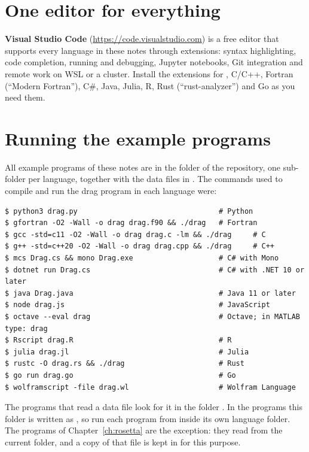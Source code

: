 \section*{One editor for everything}

\textbf{Visual Studio Code} (\url{https://code.visualstudio.com}) is a free editor that
supports every language in these notes through extensions: syntax highlighting, code
completion, running and debugging, Jupyter notebooks, Git integration and remote work on
WSL or a cluster. Install the extensions for \py, C/C++, Fortran (``Modern Fortran''), C\#,
Java, Julia, R, Rust (``rust-analyzer'') and Go as you need them.

\section*{Running the example programs}

All example programs of these notes are in the folder  of the repository,
one sub-folder per language, together with the data files in . The
commands used to compile and run the drag program in each language were:
\begin{lstlisting}[style=shell]
$ python3 drag.py                                 # Python
$ gfortran -O2 -Wall -o drag drag.f90 && ./drag   # Fortran
$ gcc -std=c11 -O2 -Wall -o drag drag.c -lm && ./drag     # C
$ g++ -std=c++20 -O2 -Wall -o drag drag.cpp && ./drag     # C++
$ mcs Drag.cs && mono Drag.exe                    # C# with Mono
$ dotnet run Drag.cs                              # C# with .NET 10 or later
$ java Drag.java                                  # Java 11 or later
$ node drag.js                                    # JavaScript
$ octave --eval drag                              # Octave; in MATLAB type: drag
$ Rscript drag.R                                  # R
$ julia drag.jl                                   # Julia
$ rustc -O drag.rs && ./drag                      # Rust
$ go run drag.go                                  # Go
$ wolframscript -file drag.wl                     # Wolfram Language
\end{lstlisting}
The programs that read a data file look for it in the folder . In the
programs this folder is written as , so run each program from inside its
own language folder. The programs of Chapter~\ref{ch:rosetta} are the exception: they read
 from the current folder, and a copy of that file is kept in
 for this purpose.

